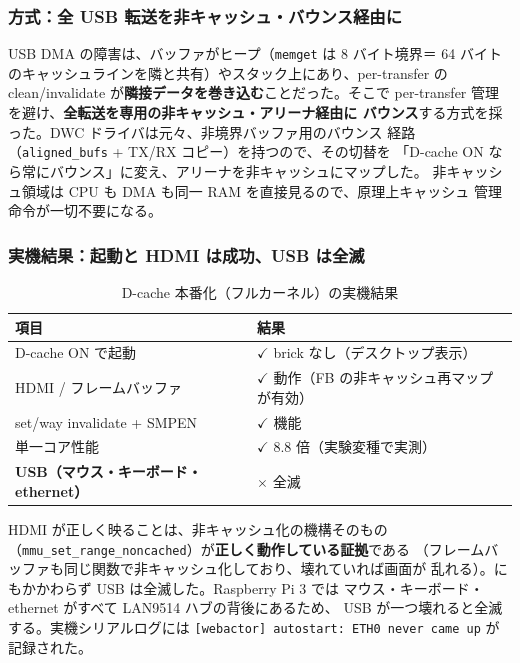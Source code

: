 \subsubsection*{方式：全 USB 転送を非キャッシュ・バウンス経由に}

USB DMA の障害は、バッファがヒープ（\texttt{memget} は 8 バイト境界＝
64 バイトのキャッシュラインを隣と共有）やスタック上にあり、per-transfer の
clean/invalidate が\textbf{隣接データを巻き込む}ことだった。そこで
per-transfer 管理を避け、\textbf{全転送を専用の非キャッシュ・アリーナ経由に
バウンス}する方式を採った。DWC ドライバは元々、非境界バッファ用のバウンス
経路（\texttt{aligned\_bufs} + TX/RX コピー）を持つので、その切替を
「D-cache ON なら常にバウンス」に変え、アリーナを非キャッシュにマップした。
非キャッシュ領域は CPU も DMA も同一 RAM を直接見るので、原理上キャッシュ
管理命令が一切不要になる。

\subsubsection*{実機結果：起動と HDMI は成功、USB は全滅}

\begin{table}[htbp]
\centering
\caption{D-cache 本番化（フルカーネル）の実機結果}
\small
\begin{tabular}{@{}ll@{}}
\toprule
項目 & 結果 \\
\midrule
D-cache ON で起動 & $\checkmark$ brick なし（デスクトップ表示） \\
HDMI / フレームバッファ & $\checkmark$ 動作（FB の非キャッシュ再マップが有効） \\
set/way invalidate + SMPEN & $\checkmark$ 機能 \\
単一コア性能 & $\checkmark$ 8.8 倍（実験変種で実測） \\
\textbf{USB（マウス・キーボード・ethernet）} & $\times$ 全滅 \\
\bottomrule
\end{tabular}
\end{table}

\noindent
HDMI が正しく映ることは、非キャッシュ化の機構そのもの
（\texttt{mmu\_set\_range\_noncached}）が\textbf{正しく動作している証拠}である
（フレームバッファも同じ関数で非キャッシュ化しており、壊れていれば画面が
乱れる）。にもかかわらず USB は全滅した。Raspberry Pi 3 では
マウス・キーボード・ethernet がすべて LAN9514 ハブの背後にあるため、
USB が一つ壊れると全滅する。実機シリアルログには
\texttt{[webactor] autostart: ETH0 never came up} が記録された。

